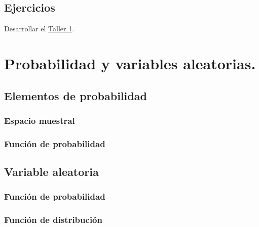 \documentclass[
]{book}
\begin{document}
\hypertarget{ejercicios}{%
\section{Ejercicios}\label{ejercicios}}

Desarrollar el \href{https://colab.research.google.com/drive/1wASaDklH5qgHqfCPdri-V2cg00KflJBf?usp=sharing}{Taller 1}.

\hypertarget{probabilidad-y-variables-aleatorias.}{%
\chapter{Probabilidad y variables aleatorias.}\label{probabilidad-y-variables-aleatorias.}}

\hypertarget{elementos-de-probabilidad}{%
\section{Elementos de probabilidad}\label{elementos-de-probabilidad}}

\hypertarget{espacio-muestral}{%
\subsection{Espacio muestral}\label{espacio-muestral}}

\hypertarget{funciuxf3n-de-probabilidad}{%
\subsection{Función de probabilidad}\label{funciuxf3n-de-probabilidad}}

\hypertarget{variable-aleatoria}{%
\section{Variable aleatoria}\label{variable-aleatoria}}

\hypertarget{funciuxf3n-de-probabilidad-1}{%
\subsection{Función de probabilidad}\label{funciuxf3n-de-probabilidad-1}}

\hypertarget{funciuxf3n-de-distribuciuxf3n}{%
\subsection{Función de distribución}\label{funciuxf3n-de-distribuciuxf3n}}
\end{document}
